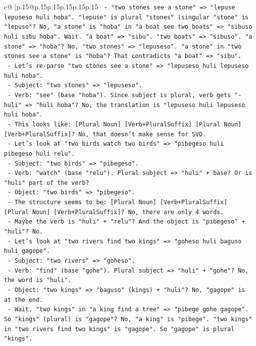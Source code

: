 \documentclass{article}
\begin{document}
{\begin{supertabular}{c@{$\;$}|p{.15\linewidth}@{}p{.15\linewidth}p{.15\linewidth}p{.15\linewidth}p{.15\linewidth}p{.15\linewidth}}
{{{\texttt{    {-} "two stones see a stone" => "lepuse lepuseso huli hoba". "lepuse" is plural "stones" (singular "stone" is "lepuso"? No, "a stone" is "hoba" in "a boat see two boats" => "sibuso huli sibu hoba". Wait. "a boat" => "sibu". "two boats" => "sibuso". "a stone" => "hoba"? No, "two stones" => "lepuseso". "a stone" in "two stones see a stone" is "hoba"? That contradicts "a boat" => "sibu".} \\
\texttt{    {-} Let's re{-}parse "two stones see a stone" => "lepuseso huli lepuseso huli hoba".} \\
\texttt{      {-} Subject: "two stones" => "lepuseso".} \\
\texttt{      {-} Verb: "see" (base "hoba"). Since subject is plural, verb gets "{-}huli" => "huli hoba"? No, the translation is "lepuseso huli lepuseso huli hoba".} \\
\texttt{      {-} This looks like: {[}Plural Noun{]} {[}Verb+PluralSuffix{]} {[}Plural Noun{]} {[}Verb+PluralSuffix{]}? No, that doesn't make sense for SVO.} \\
\texttt{      {-} Let's look at "two birds watch two birds" => "pibegeso huli pibegeso huli relu".} \\
\texttt{        {-} Subject: "two birds" => "pibegeso".} \\
\texttt{        {-} Verb: "watch" (base "relu"). Plural subject => "huli" + base? Or is "huli" part of the verb?} \\
\texttt{        {-} Object: "two birds" => "pibegeso".} \\
\texttt{        {-} The structure seems to be: {[}Plural Noun{]} {[}Verb+PluralSuffix{]} {[}Plural Noun{]} {[}Verb+PluralSuffix{]}? No, there are only 4 words.} \\
\texttt{        {-} Maybe the verb is "huli" + "relu"? And the object is "pibegeso" + "huli"? No.} \\
\texttt{        {-} Let's look at "two rivers find two kings" => "goheso huli baguso huli gagope".} \\
\texttt{          {-} Subject: "two rivers" => "goheso".} \\
\texttt{          {-} Verb: "find" (base "gohe"). Plural subject => "huli" + "gohe"? No, the word is "huli".} \\
\texttt{          {-} Object: "two kings" => "baguso" (kings) + "huli"? No, "gagope" is at the end.} \\
\texttt{          {-} Wait, "two kings" in "a king find a tree" => "pibege gohe gagope". So "kings" (plural) is "gagope"? No, "a king" is "pibege". "two kings" in "two rivers find two kings" is "gagope". So "gagope" is plural "kings".} \\
}}}
\end{supertabular}}
\end{document}
